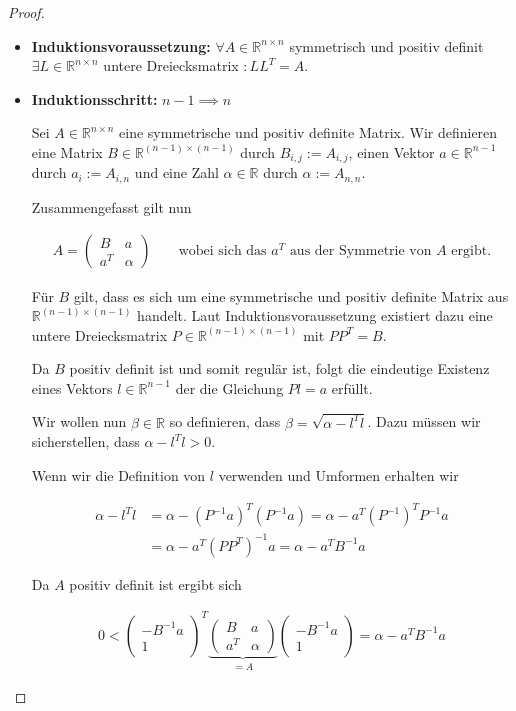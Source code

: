 \documentclass[]{article}
\begin{document}
\begin{proof}
\begin{itemize}
		\item \textbf{Induktionsvoraussetzung:} $\forall A \in \mathbb{R}^{n \times n}$ symmetrisch und positiv definit $\exists L \in \mathbb{R}^{n\times n}$ untere Dreiecksmatrix $:LL^T=A$.
		
		\item \textbf{Induktionsschritt:} $n-1 \implies n$
		
		Sei $A \in \mathbb{R}^{n\times n}$ eine symmetrische und positiv definite Matrix. Wir definieren eine Matrix $B \in \mathbb{R}^{(n-1)\times(n-1)}$ durch $B_{i,j} := A_{i,j}$, einen Vektor $a \in \mathbb{R}^{n-1}$ durch $a_i := A_{i,n}$ und eine Zahl $\alpha \in \mathbb{R}$ durch $\alpha := A_{n,n}$.
		
		Zusammengefasst gilt nun
		
		\begin{align*}
			A = \begin{pmatrix}
				B & a \\
				a^T & \alpha
			\end{pmatrix} && \text{ wobei sich das }a^T\text{ aus der Symmetrie von }A\text{ ergibt.}
		\end{align*}
	
		Für $B$ gilt, dass es sich um eine symmetrische und positiv definite Matrix aus $\mathbb{R}^{(n-1)\times(n-1)}$ handelt. Laut Induktionsvoraussetzung existiert dazu eine untere Dreiecksmatrix $P \in \mathbb{R}^{(n-1)\times(n-1)}$ mit $PP^T=B$.
		
		Da $B$ positiv definit ist und somit regulär ist, folgt die eindeutige Existenz eines Vektors $l \in \mathbb{R}^{n-1}$ der die Gleichung $Pl=a$ erfüllt.
		
		Wir wollen nun $\beta \in \mathbb{R}$ so definieren, dass $\beta = \sqrt{\alpha - l^Tl}$. Dazu müssen wir sicherstellen, dass $\alpha - l^Tl > 0$.
		
		Wenn wir die Definition von $l$ verwenden und Umformen erhalten wir
		
		\begin{align*}
			\alpha - l^Tl &= \alpha - (P^{-1}a)^T(P^{-1}a) = \alpha - a^T (P^{-1})^TP^{-1}a \\
			&= \alpha - a^T (PP^T)^{-1}a = \alpha - a^T B^{-1}a
		\end{align*}
	
		Da $A$ positiv definit ist ergibt sich
	
		\begin{align*}
			0 < \begin{pmatrix}
				-B^{-1}a\\
				1
			\end{pmatrix}^T
			\underbrace{\begin{pmatrix}
				B & a\\
				a^T & \alpha
			\end{pmatrix}}_{=A}
			\begin{pmatrix}
				-B^{-1}a\\
				1
			\end{pmatrix} =
			\alpha - a^T B^{-1} a
		\end{align*}
	

\end{itemize}
\end{proof}
\end{document}
